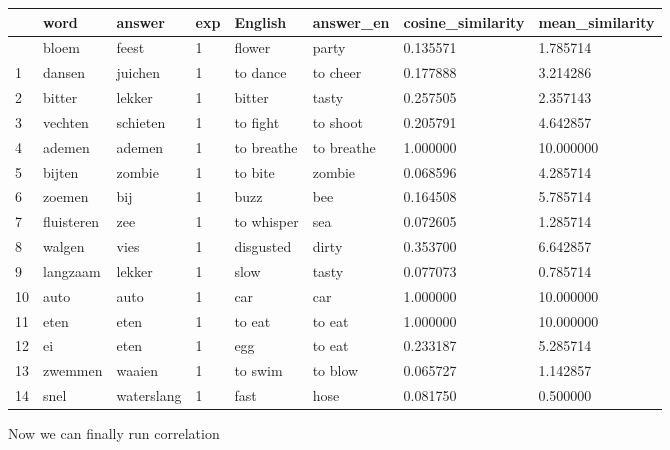 \documentclass[
  letterpaper,
  DIV=11,
  numbers=noendperiod]{scrreprt}
\begin{document}
\begin{longtable}[]{@{}llllllll@{}}
\toprule\noalign{}
& word & answer & exp & English & answer\_en & cosine\_similarity &
mean\_similarity \\
\midrule\noalign{}
\endhead
\bottomrule\noalign{}
\endlastfoot
0 & bloem & feest & 1 & flower & party & 0.135571 & 1.785714 \\
1 & dansen & juichen & 1 & to dance & to cheer & 0.177888 & 3.214286 \\
2 & bitter & lekker & 1 & bitter & tasty & 0.257505 & 2.357143 \\
3 & vechten & schieten & 1 & to fight & to shoot & 0.205791 &
4.642857 \\
4 & ademen & ademen & 1 & to breathe & to breathe & 1.000000 &
10.000000 \\
5 & bijten & zombie & 1 & to bite & zombie & 0.068596 & 4.285714 \\
6 & zoemen & bij & 1 & buzz & bee & 0.164508 & 5.785714 \\
7 & fluisteren & zee & 1 & to whisper & sea & 0.072605 & 1.285714 \\
8 & walgen & vies & 1 & disgusted & dirty & 0.353700 & 6.642857 \\
9 & langzaam & lekker & 1 & slow & tasty & 0.077073 & 0.785714 \\
10 & auto & auto & 1 & car & car & 1.000000 & 10.000000 \\
11 & eten & eten & 1 & to eat & to eat & 1.000000 & 10.000000 \\
12 & ei & eten & 1 & egg & to eat & 0.233187 & 5.285714 \\
13 & zwemmen & waaien & 1 & to swim & to blow & 0.065727 & 1.142857 \\
14 & snel & waterslang & 1 & fast & hose & 0.081750 & 0.500000 \\
\end{longtable}

Now we can finally run correlation
\end{document}
